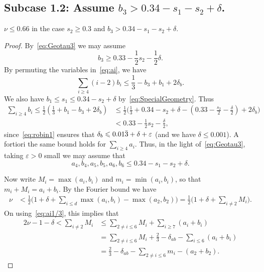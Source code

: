 \subsection*{Subcase 1.2: Assume $b_3> 0.34-s_1-s_2+\delta$.}
\begin{lemma}\label{lem:Subcase1.2}
  \leanok
  $\nu \leq 0.66$ in the case $s_2 \geq 0.3$ and $b_3 > 0.34-s_1-s_2+\delta$.
\end{lemma}
\begin{proof}
  \leanok
  By~\eqref{eq:Geotau3} we may assume
  \begin{equation}\label{eq:b3}
    b_3\geq 0.33 -\frac{1}{2}s_2-\frac{1}{2}\delta.
  \end{equation}
  By permuting the variables in~\eqref{eq:ai}, we have
  \[
  \sum_{i\ge4} (i-2)b_i\le\frac{1}{3}-b_3+b_1 + 2\delta_b.
  \]
  We also have
  $b_1\leq s_1\leq 0.34 -s_2+\delta$
  by~\eqref{eq:SpecialGeometry}.
  Thus
  \begin{align*}
    \sum_{i\geq 4}b_i \le \frac{1}{2}\left(\frac{1}{3}+b_1-b_3+2\delta_b\right)
    &\le \frac{1}{2}\Big(\frac{1}{3}+0.34
    -s_2+\delta
    -
    (0.33
    -\frac{s_2}{2}
    -\frac{\delta}{2})
    +2\delta_b\Big)\\ &< 0.33-\frac{1}{2}s_2-\frac{\delta}{2},
  \end{align*}
  since~\eqref{eq:robin1} ensures that $\delta_b\leqslant 0.01\bar 3+\delta+\varepsilon$ (and we have $\delta\leq 0.001$).
  A fortiori the same bound holds for $\sum_{i\geq 4}a_i$.
  Thus, in the light of~\eqref{eq:Geotau3}, taking $\varepsilon>0$ small we may assume that
  \[
  a_4,b_4,a_5,b_5,a_6,b_6\leq 0.34-s_1-s_2+\delta.
  \]

  Now write $M_i = \max(a_i,b_i)$ and $m_i = \min(a_i,b_i)$, so that $m_i+M_i=a_i+b_i$.
  By the Fourier bound we have
  \begin{align*}
  \nu & < \frac{1}{2}\Big(1+\delta+ \sum_{i\leq d} \max(a_i,b_i) - \max(a_2,b_2)\Big) = \frac{1}{2}\Big(1 +\delta+ \sum_{i\neq 2}M_i\Big).
  \end{align*}
  On using~\eqref{eq:ai1/3},
  this implies that
  \begin{align*}
  2\nu -1-\delta < \sum_{i\neq 2} M_i &\le \sum_{2\neq i \le 6}M_i + \sum_{i\ge7} (a_i+b_i)\\
  &= \sum_{2\neq i \le 6}M_i + \frac{2}{3} -\delta_{ab} - \sum_{i\le 6}(a_i+b_i)\\
  &= \frac{2}{3} -\delta_{ab}-\sum_{2\neq i \le 6}m_i - (a_2+b_2).
  \end{align*}


\end{proof}
